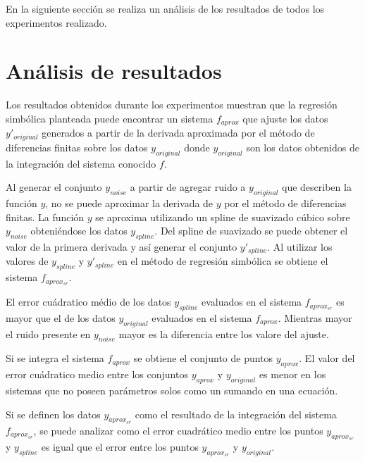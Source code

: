 En la siguiente sección se realiza un análisis de los resultados de todos los experimentos realizado.

\section{Análisis de resultados}\label{section:experiments_results}

Los resultados obtenidos durante los experimentos muestran que la regresión simbólica planteada puede encontrar un sistema $f_{aprox}$ que ajuste los datos $y'_{original}$ generados a partir de la derivada aproximada por el método de diferencias finitas sobre los datos $y_{original}$ donde $y_{original}$ son los datos obtenidos de la integración del sistema conocido $f$.

Al generar el conjunto $y_{noise}$ a partir de agregar ruido a $y_{original}$ que describen la función $y$, no se puede aproximar la derivada de $y$ por el método de diferencias finitas. La función $y$ se aproxima utilizando un spline de suavizado cúbico sobre $y_{noise}$ obteniéndose los datos $y_{spline}$. Del spline de suavizado se puede obtener el valor de la primera derivada y así generar el conjunto $y'_{spline}$. Al utilizar los valores de $y_{spline}$ y $y'_{spline}$ en el método de regresión simbólica se obtiene el sistema $f_{aprox_{sr}}$.

El error cuádratico médio de los datos $y_{spline}$ evaluados en el sistema $f_{aprox_{sr}}$ es mayor que el de los datos $y_{original}$ evaluados en el sistema $f_{aprox}$. Mientras mayor el ruido presente en $y_{noise}$ mayor es la diferencia entre los valore del ajuste.

Si se integra el sistema $f_{aprox}$ se obtiene el conjunto de puntos $y_{aprox}$. El valor del error cuádratico medio entre los conjuntos $y_{aprox}$ y $y_{original}$ es menor en los sistemas que no poseen parámetros solos como un sumando en una ecuación.

Si se definen los datos $y_{aprox_{sr}}$ como el resultado de la integración del sistema $f_{aprox_{sr}}$, se puede analizar como el error cuadrático medio entre los puntos $y_{aprox_{sr}}$ y $y_{spline}$ es igual que el error entre los puntos $y_{aprox_{sr}}$ y $y_{original}$.